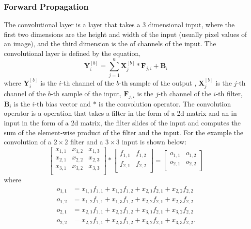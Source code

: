 \documentclass[11pt]{article}
\theoremstyle{definition}
\begin{document}
\subsubsection{Forward Propagation}
The convolutional layer is a layer that takes a 3 dimensional input, where the first 
two dimensions are the height and width of the input (usually pixel values of an 
image), and the third dimension is the of channels of the input. The convolutional 
layer is defined by the equation,
\begin{equation}
    \mathbf{Y}_{i}^{[b]} = \sum_{j=1}^n \mathbf{X}_{j}^{[b]} \ast  \mathbf{F}_{j,i} + \mathbf{B}_{i}
\end{equation}
where $\mathbf{Y}_{i}^{[b]}$ is the $i$-th channel of the $b$-th sample of the output , 
$\mathbf{X}_{j}^{[b]}$ is the $j$-th channel of the $b$-th sample of the input, 
$\mathbf{F}_{j,i}$ is the $j$-th channel of the $i$-th filter, $\mathbf{B}_{i}$ is the 
$i$-th bias vector and $\ast$ is the convolution operator. The convolution operator 
is a operation that takes a filter in the form of a 2d matrix and an in input in the
form of a 2d matrix, the filter slides of the input and computes the sum of the 
element-wise product of the filter and the input. For the example the convolution
of a $2 \times 2$ filter and a $3 \times 3$ input is shown below:
\begin{equation}
    \begin{bmatrix}
        x_{1,1} & x_{1,2} & x_{1,3} \\
        x_{2,1} & x_{2,2} & x_{2,3} \\
        x_{3,1} & x_{3,2} & x_{3,3} \\
    \end{bmatrix} \ast
    \begin{bmatrix}
        f_{1,1} & f_{1,2} \\
        f_{2,1} & f_{2,2} \\
    \end{bmatrix} =
    \begin{bmatrix}
        o_{1,1} & o_{1,2} \\
        o_{2,1} & o_{2,2} \\
    \end{bmatrix}
\end{equation}
where
\begin{equation}
\begin{align*}
    o_{1,1} &= x_{1,1}f_{1,1} + x_{1,2}f_{1,2} + x_{2,1}f_{2,1} + x_{2,2}f_{2,2}\\ 
    o_{1,2} &= x_{1,2}f_{1,1} + x_{1,3}f_{1,2} + x_{2,2}f_{2,1} + x_{2,3}f_{2,2}\\
    o_{2,1} &= x_{2,1}f_{1,1} + x_{2,2}f_{1,2} + x_{3,1}f_{2,1} + x_{3,2}f_{2,2}\\
    o_{2,2} &= x_{2,2}f_{1,1} + x_{2,3}f_{1,2} + x_{3,2}f_{2,1} + x_{3,3}f_{2,2}.\\
\end{align*}
\end{equation}
\end{document}
